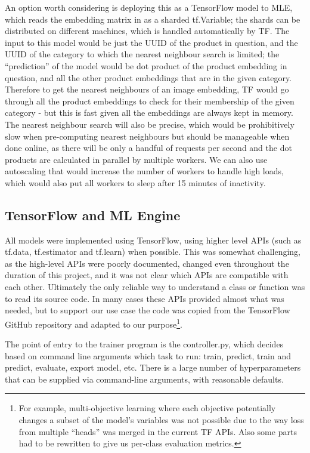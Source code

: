 An option worth considering is deploying this as a TensorFlow model to MLE, which reads the embedding matrix in as a sharded tf.Variable; the shards can be distributed on different machines, which is handled automatically by TF.
The input to this model would be just the UUID of the product in question, and the UUID of the category to which the nearest neighbour search is limited; the ``prediction'' of the model would be dot product of the product embedding in question, and all the other product embeddings that are in the given category.
Therefore to get the nearest neighbours of an image embedding, TF would go through all the product embeddings to check for their membership of the given category - but this is fast given all the embeddings are always kept in memory.
The nearest neighbour search will also be precise, which would be prohibitively slow when pre-computing nearest neighbours but should be manageable when done online, as there will be only a handful of requests per second and the dot products are calculated in parallel by multiple workers.
We can also use autoscaling that would increase the number of workers to handle high loads, which would also put all workers to sleep after 15 minutes of inactivity.

\subsection{TensorFlow and ML Engine}

All models were implemented using TensorFlow, using higher level APIs (such as tf.data, tf.estimator and tf.learn) when possible.
This was somewhat challenging, as the high-level APIs were poorly documented, changed even throughout the duration of this project, and it was not clear which APIs are compatible with each other.
Ultimately the only reliable way to understand a class or function was to read its source code.
In many cases these APIs provided almost what was needed, but to support our use case the code was copied from the TensorFlow GitHub repository and adapted to our purpose\footnote{For example, multi-objective learning where each objective potentially changes a subset of the model's variables was not possible due to the way loss from multiple ``heads'' was merged in the current TF APIs. Also some parts had to be rewritten to give us per-class evaluation metrics.}.

The point of entry to the trainer program is the controller.py, which decides based on command line arguments which task to run: train, predict, train and predict, evaluate, export model, etc.
There is a large number of hyperparameters that can be supplied via command-line arguments, with reasonable defaults.

